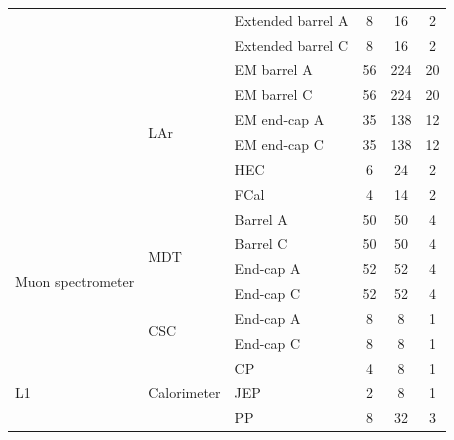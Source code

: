 \begin {table}[h!]
\begin{center}
\begin{tabular}{ | l | l | l | c | c | c | }
									& 							& Extended barrel A & 8 		& 16 		& 2 		\\%
									&							& Extended barrel C & 8 		& 16 		& 2 		\\%
									\cline{2-6}
									& \multirow{6}{*}{LAr}		& EM barrel A 		& 56 		& 224 		& 20 		\\%
									& 							& EM barrel C 		& 56 		& 224 		& 20 		\\%
									& 							& EM end-cap A 		& 35 		& 138 		& 12 		\\%
									& 							& EM end-cap C 		& 35  		& 138 		& 12 		\\%
									&							& HEC 				& 6 		& 24 		& 2 		\\%
									& 							& FCal 				& 4 		& 14 		& 2 		\\%
		\hline
\multirow{6}{*}{Muon spectrometer}	& \multirow{4}{*}{MDT}		& Barrel A 			& 50 		& 50 		& 4 		\\%
									& 							& Barrel C 			& 50 		& 50 		& 4 		\\%
									& 							& End-cap A 		& 52 		& 52 		& 4  		\\%
									& 							& End-cap C 		& 52 		& 52 		& 4 		\\%
									\cline{2-6}
									& \multirow{2}{*}{CSC} 		& End-cap A 		& 8 		& 8 		& 1 		\\%
									&							& End-cap C 		& 8 		& 8 		& 1 		\\%
		\hline
\multirow{9}{*}{L1}					& \multirow{3}{*}{Calorimeter} & CP				& 4 		& 8 		& 1  		\\%
									& 							& JEP 				& 2 		& 8 		& 1 		\\%
									& 							& PP 				& 8 		& 32 		& 3 		\\%

\end{tabular}
\end{center}
\end{table}
